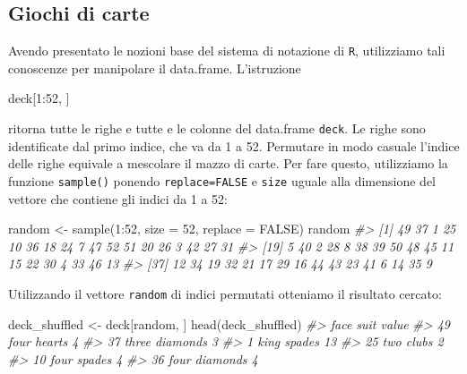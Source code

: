 \documentclass[
]{memoir}
\newenvironment{Shaded}{\begin{snugshade}}{\end{snugshade}}
\newcommand{\AttributeTok}[1]{\textcolor[rgb]{0.77,0.63,0.00}{#1}}
\newcommand{\CommentTok}[1]{\textcolor[rgb]{0.56,0.35,0.01}{\textit{#1}}}
\newcommand{\ConstantTok}[1]{\textcolor[rgb]{0.00,0.00,0.00}{#1}}
\newcommand{\DecValTok}[1]{\textcolor[rgb]{0.00,0.00,0.81}{#1}}
\newcommand{\FunctionTok}[1]{\textcolor[rgb]{0.00,0.00,0.00}{#1}}
\newcommand{\NormalTok}[1]{#1}
\newcommand{\OtherTok}[1]{\textcolor[rgb]{0.56,0.35,0.01}{#1}}
\newcommand{\SpecialCharTok}[1]{\textcolor[rgb]{0.00,0.00,0.00}{#1}}
\theoremstyle{definition}
\theoremstyle{definition}
\theoremstyle{definition}
\theoremstyle{definition}
\theoremstyle{remark}
\begin{document}
\hypertarget{giochi-di-carte}{%
\subsection{Giochi di carte}\label{giochi-di-carte}}

Avendo presentato le nozioni base del sistema di notazione di \texttt{R},
utilizziamo tali conoscenze per manipolare il data.frame. L'istruzione

\begin{Shaded}
\begin{Highlighting}[]
\NormalTok{deck[}\DecValTok{1}\SpecialCharTok{:}\DecValTok{52}\NormalTok{, ]}
\end{Highlighting}
\end{Shaded}

ritorna tutte le righe e tutte e le colonne del data.frame \texttt{deck}. Le
righe sono identificate dal primo indice, che va da 1 a 52. Permutare in
modo casuale l'indice delle righe equivale a mescolare il mazzo di
carte. Per fare questo, utilizziamo la funzione \texttt{sample()} ponendo \texttt{replace=FALSE} e \texttt{size}
uguale alla dimensione del vettore che contiene gli indici da 1 a 52:

\begin{Shaded}
\begin{Highlighting}[]
\NormalTok{random }\OtherTok{\textless{}{-}} \FunctionTok{sample}\NormalTok{(}\DecValTok{1}\SpecialCharTok{:}\DecValTok{52}\NormalTok{, }\AttributeTok{size =} \DecValTok{52}\NormalTok{, }\AttributeTok{replace =} \ConstantTok{FALSE}\NormalTok{)}
\NormalTok{random}
\CommentTok{\#\textgreater{}  [1] 49 37  1 25 10 36 18 24  7 47 52 51 20 26  3 42 27 31}
\CommentTok{\#\textgreater{} [19]  5 40  2 28  8 38 39 50 48 45 11 15 22 30  4 33 46 13}
\CommentTok{\#\textgreater{} [37] 12 34 19 32 21 17 29 16 44 43 23 41  6 14 35  9}
\end{Highlighting}
\end{Shaded}

Utilizzando il vettore \texttt{random} di indici permutati otteniamo il
risultato cercato:

\begin{Shaded}
\begin{Highlighting}[]
\NormalTok{deck\_shuffled }\OtherTok{\textless{}{-}}\NormalTok{ deck[random, ]}
\FunctionTok{head}\NormalTok{(deck\_shuffled)}
\CommentTok{\#\textgreater{}     face     suit value}
\CommentTok{\#\textgreater{} 49  four   hearts     4}
\CommentTok{\#\textgreater{} 37 three diamonds     3}
\CommentTok{\#\textgreater{} 1   king   spades    13}
\CommentTok{\#\textgreater{} 25   two    clubs     2}
\CommentTok{\#\textgreater{} 10  four   spades     4}
\CommentTok{\#\textgreater{} 36  four diamonds     4}
\end{Highlighting}
\end{Shaded}
\end{document}
